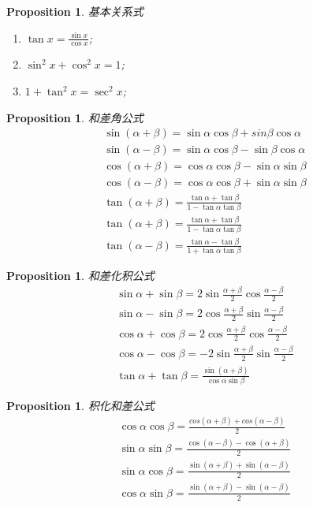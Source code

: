 \documentclass{article}
\newtheorem{proposition}[theorem]{Proposition}
\begin{document}
\begin{proposition}
\rm 基本关系式
\begin{enumerate}
	\item $\tan x = \frac{\sin x}{\cos x}$;
	\item $\sin^2 x + \cos^2 x =1$;
	\item $1 + \tan^2 x = \sec^2 x$;
\end{enumerate}
\end{proposition}

\begin{proposition}
\rm 和差角公式
$$
\begin{array}{ll}
\sin(\alpha + \beta) = \sin \alpha \cos \beta + sin \beta \cos \alpha \\
\sin(\alpha - \beta) = \sin \alpha \cos \beta - \sin \beta \cos \alpha \\
\cos(\alpha + \beta) = \cos \alpha \cos \beta - \sin \alpha \sin \beta \\
\cos(\alpha - \beta) = \cos \alpha \cos \beta + \sin \alpha \sin \beta \\
\tan(\alpha + \beta) = \frac{\tan \alpha + \tan \beta}{1-\tan\alpha\tan\beta} \\ 
\tan(\alpha + \beta) = \frac{\tan \alpha + \tan \beta}{1-\tan\alpha\tan\beta} \\
\tan(\alpha - \beta) = \frac{\tan \alpha - \tan \beta}{1+\tan\alpha\tan\beta}
\end{array}
$$
\end{proposition}

\begin{proposition}
\rm 和差化积公式
$$
\begin{array}{ll}
\sin \alpha + \sin \beta = 2\sin\frac{\alpha + \beta}{2}\cos\frac{\alpha - \beta}{2} \\
\sin \alpha - \sin \beta = 2\cos\frac{\alpha + \beta}{2}\sin\frac{\alpha - \beta}{2} \\
\cos \alpha + \cos \beta = 2\cos\frac{\alpha + \beta}{2}\cos\frac{\alpha - \beta}{2} \\
\cos \alpha - \cos \beta = - 2\sin\frac{\alpha + \beta}{2}\sin\frac{\alpha - \beta}{2} \\
\tan \alpha + \tan \beta = \frac{\sin (\alpha + \beta)}{\cos \alpha \sin \beta} 
\end{array}
$$
\end{proposition}

\begin{proposition}
\rm 积化和差公式
$$
\begin{array}{ll}
\cos\alpha \cos\beta = \frac{cos(\alpha+\beta)+cos(\alpha-\beta)}{2} \\
\sin\alpha \sin\beta = \frac{\cos(\alpha-\beta)-\cos(\alpha+\beta)}{2} \\ 
\sin\alpha \cos\beta = \frac{\sin(\alpha+\beta)+\sin(\alpha-\beta)}{2} \\
\cos\alpha \sin\beta = \frac{\sin(\alpha+\beta)-\sin(\alpha-\beta)}{2} \\ 
\end{array}
$$
\end{proposition}
\end{document}
